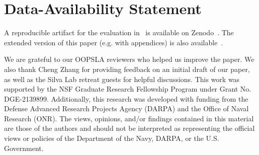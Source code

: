 \documentclass[acmsmall]{acmart}
\theoremstyle{remark}
\theoremstyle{acmplain}
\begin{document}
\maketitle

















\clearpage
\section*{Data-Availability Statement}
A reproducible artifact for the evaluation in~ is available on Zenodo~\cite{Wu2026SliceArtifact}. The extended version of this paper (e.g. with appendices) is also available~\cite{Wu2026SliceExtended}.

\begin{acks}
We are grateful to our OOPSLA reviewers who helped us improve the paper. We also thank Cheng Zhang for providing feedback on an initial draft of our paper, as well as the Silva Lab retreat guests for helpful discussions. This work was supported by the NSF Graduate Research Fellowship Program under Grant No. DGE-2139899. Additionally, this research was developed with funding from the Defense Advanced Research Projects Agency (DARPA) and the
Office of Naval Research (ONR). The views, opinions, and/or findings contained in this material are those of the authors
and should not be interpreted as representing the official views or policies of the Department of the Navy, DARPA, or the U.S. Government. 
\end{acks}




\end{document}

